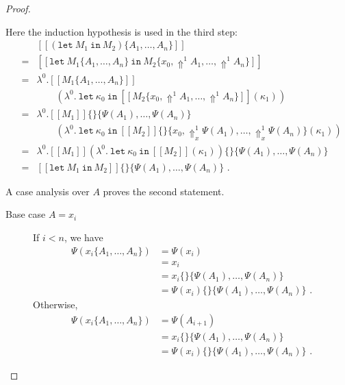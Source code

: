 \documentclass[a4paper,11pt,draft]{article}
\newcommand{\kw}[1]{\mathtt{#1}}
\begin{document}
\begin{proof}
\begin{description}
  Here the induction hypothesis is used in the third step:
  \begin{eqnarray*} %
    &   & [\![(\kw{let} \: M_{1} \: \kw{in} \: M_{2})\{A_{1}, \ldots, A_{n}\}]\!] \\
    & = & [\![\kw{let} \: M_{1}\{A_{1}, \ldots, A_{n}\} \: \kw{in} \: M_{2}\{x_{0}, \Uparrow^{1} A_{1}, \ldots, \Uparrow^{1} A_{n}\}]\!] \\
    & = & \lambda^{0}.[\![M_{1}\{A_{1}, \ldots, A_{n}\}]\!] \\
    &   & \qquad (\lambda^{0}. \: \kw{let} \: \kappa_{0} \: \kw{in} \: [\![M_{2}\{x_{0}, \Uparrow^{1} A_{1}, \ldots, \Uparrow^{1} A_{n}\}]\!](\kappa_{1})) \\
    & = & \lambda^{0}.[\![M_{1}]\!]\{\}\{\Psi(A_{1}), \ldots, \Psi(A_{n})\} \\
    &   & \qquad (\lambda^{0}. \: \kw{let} \: \kappa_{0} \: \kw{in} \: [\![M_{2}]\!]\{\}\{x_{0}, \Uparrow_{x}^{1} \Psi(A_{1}), \ldots, \Uparrow_{x}^{1} \Psi(A_{n})\}(\kappa_{1})) \\
    & = & \lambda^{0}.[\![M_{1}]\!](\lambda^{0}. \: \kw{let} \: \kappa_{0} \: \kw{in} \: [\![M_{2}]\!](\kappa_{1}))\{\}\{\Psi(A_{1}), \ldots, \Psi(A_{n})\} \\
    & = & [\![\kw{let} \: M_{1} \: \kw{in} \: M_{2}]\!]\{\}\{\Psi(A_{1}), \ldots, \Psi(A_{n})\} \text{ .}
  \end{eqnarray*}
\end{description}

A case analysis over $A$ proves the second statement.

\begin{description}
\item[\sffamily Base case $A = x_{i}$]\hfill

  If $i < n$, we have
  \begin{align*}
    \Psi(x_{i}\{A_{1}, \ldots, A_{n}\}) &= \Psi(x_{i}) \\
                                      &= x_{i} \\
                                      &= x_{i}\{\}\{\Psi(A_{1}), \ldots, \Psi(A_{n})\} \\
                                      &= \Psi(x_{i})\{\}\{\Psi(A_{1}), \ldots, \Psi(A_{n})\} \text{ .}
  \end{align*}
  Otherwise,
  \begin{align*}
    \Psi(x_{i}\{A_{1}, \ldots, A_{n}\}) &= \Psi(A_{i+1}) \\
                                      &= x_{i}\{\}\{\Psi(A_{1}), \ldots, \Psi(A_{n})\} \\
                                      &= \Psi(x_{i})\{\}\{\Psi(A_{1}), \ldots, \Psi(A_{n})\} \text{ .}
  \end{align*}


\end{description}
\end{proof}
\end{document}
